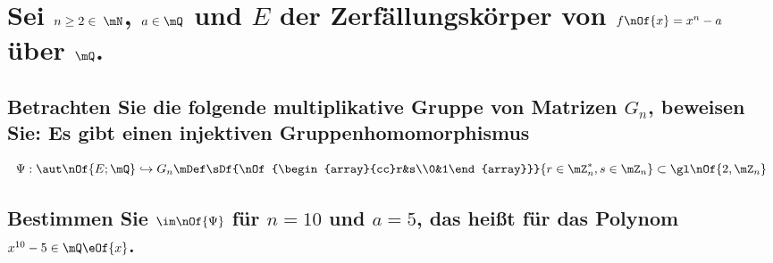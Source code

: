 \section{Sei $n\geq 2 \in\;\mN$, $a\in\mQ$ und $E$ der Zerfällungskörper von $f\nOf{x}=x^n-a$ über $\mQ$.}
\subsection{Betrachten Sie die folgende multiplikative Gruppe von Matrizen $G_n$, beweisen Sie: Es gibt einen injektiven Gruppenhomomorphismus}
\begin{equation}
	\Psi:\aut\nOf{E;\mQ} \hookrightarrow G_n\mDef\sDf{\nOf{\begin{array}{cc}r&s\\0&1\end{array}}}{r\in\mZ^*_n,s\in\mZ_n}\subset\gl\nOf{2,\mZ_n}
\end{equation}


\subsection{Bestimmen Sie $\im\nOf{\Psi}$ für $n=10$ und $a=5$, das heißt für das Polynom $x^{10}-5\in\mQ\eOf{x}$.}